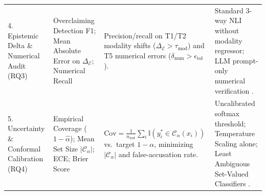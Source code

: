 \documentclass[sigconf]{acmart}
\begin{document}
\begin{table}[t]
\begin{tabularx}{\textwidth}{L{2.7cm} L{3.3cm} L{4.2cm} Y}
4. Epistemic Delta \& Numerical Audit (RQ3) & Overclaiming Detection F1; Mean Absolute Error on $\Delta_{\mathcal{E}}$; Numerical Recall & Precision/recall on T1/T2 modality shifts ($\Delta_{\mathcal{E}} > \tau_{\text{mod}}$) and T5 numerical errors ($\delta_{\text{num}} > \epsilon_{\text{tol}}$). & Standard 3-way NLI without modality regressor; LLM prompt-only numerical verification \cite{lu2023scitab,akhtar2023reading}. \\
5. Uncertainty \& Conformal Calibration (RQ4) & Empirical Coverage ($1-\hat{\alpha}$); Mean Set Size $|\mathcal{C}_{\alpha}|$; ECE; Brier Score & $\text{Cov} = \frac{1}{n_{\text{test}}}\sum_{i} \mathbb{I}(y_i^* \in \mathcal{C}_{\alpha}(x_i))$ vs.\ target $1-\alpha$, minimizing $|\mathcal{C}_{\alpha}|$ and false-accusation rate. & Uncalibrated softmax threshold; Temperature Scaling alone; Least Ambiguous Set-Valued Classifiers \cite{sadinle2019least,angelopoulos2023conformal}. \\
\bottomrule
\end{tabularx}
\end{table}
\end{document}
